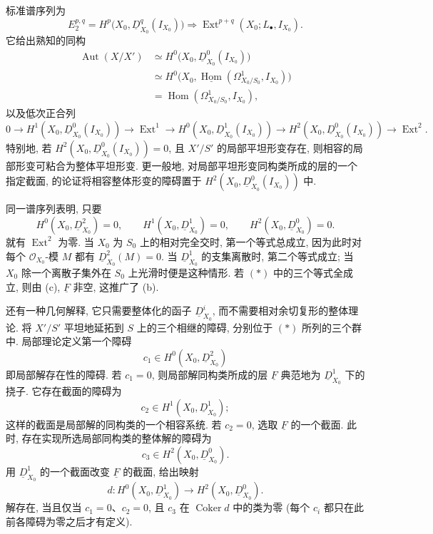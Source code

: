 标准谱序列为
\[
E_2^{p,q}
=H^p\bigl(X_0,\underline D^q_{X_0}(I_{X_0})\bigr)
\Longrightarrow
\operatorname{Ext}^{p+q}(X_0;L_\bullet,I_{X_0}).
\]
它给出熟知的同构
\begin{align*}
\operatorname{Aut}(X/X')
&\simeq H^0\bigl(X_0,\underline D^0_{X_0}(I_{X_0})\bigr)\\
&\simeq H^0\bigl(X_0,
  \underline{\operatorname{Hom}}
  (\Omega^1_{X_0/S_0},I_{X_0})\bigr)\\
&=\operatorname{Hom}(\Omega^1_{X_0/S_0},I_{X_0}),
\end{align*}
以及低次正合列
\[
0\longrightarrow H^1(X_0,\underline D^0_{X_0}(I_{X_0}))
\longrightarrow\operatorname{Ext}^1
\longrightarrow H^0(X_0,\underline D^1_{X_0}(I_{X_0}))
\longrightarrow H^2(X_0,\underline D^0_{X_0}(I_{X_0}))
\longrightarrow\operatorname{Ext}^2.
\]
特别地, 若 $H^2(X_0,\underline D^0_{X_0}(I_{X_0}))=0$, 且 $X'/S'$ 的局部平坦形变存在, 则相容的局部形变可粘合为整体平坦形变. 更一般地, 对局部平坦形变同构类所成的层的一个指定截面,  的论证将相容整体形变的障碍置于 $H^2(X_0,\underline D^0_{X_0}(I_{X_0}))$ 中.


同一谱序列表明, 只要
\begin{equation}\tag{*}
H^0(X_0,\underline D^2_{X_0})=0,
\qquad
H^1(X_0,\underline D^1_{X_0})=0,
\qquad
H^2(X_0,\underline D^0_{X_0})=0.
\end{equation}
就有 $\operatorname{Ext}^2$ 为零. 当 $X_0$ 为 $S_0$ 上的相对完全交时, 第一个等式总成立, 因为此时对每个 $\mathcal O_{X_0}$-模 $M$ 都有 $\underline D^2_{X_0}(M)=0$. 当 $\underline D^1_{X_0}$ 的支集离散时, 第二个等式成立; 当 $X_0$ 除一个离散子集外在 $S_0$ 上光滑时便是这种情形. 若 $(*)$ 中的三个等式全成立, 则由 (c), $\underline F$ 非空, 这推广了 (b).

还有一种几何解释, 它只需要整体化的函子 $\underline D^i_{X_0}$, 而不需要相对余切复形的整体理论. 将 $X'/S'$ 平坦地延拓到 $S$ 上的三个相继的障碍, 分别位于 $(*)$ 所列的三个群中. 局部理论定义第一个障碍
\[
c_1\in H^0(X_0,\underline D^2_{X_0})
\]
即局部解存在性的障碍. 若 $c_1=0$, 则局部解同构类所成的层 $\underline F$ 典范地为 $\underline D^1_{X_0}$ 下的挠子. 它存在截面的障碍为
\[
c_2\in H^1(X_0,\underline D^1_{X_0});
\]
这样的截面是局部解的同构类的一个相容系统. 若 $c_2=0$, 选取 $\underline F$ 的一个截面. 此时, 存在实现所选局部同构类的整体解的障碍为
\[
c_3\in H^2(X_0,\underline D^0_{X_0}).
\]
用 $\underline D^1_{X_0}$ 的一个截面改变 $\underline F$ 的截面, 给出映射
\[
d:H^0(X_0,\underline D^1_{X_0})
\longrightarrow H^2(X_0,\underline D^0_{X_0}).
\]
解存在, 当且仅当 $c_1=0$、$c_2=0$, 且 $c_3$ 在 $\operatorname{Coker}d$ 中的类为零 (每个 $c_i$ 都只在此前各障碍为零之后才有定义).

